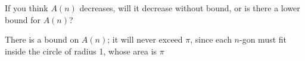 \documentclass{article}
\begin{document}
\begin{enumerate}
\begin{enumerate}
\begin{problem}[\vfill]
      If you think $A(n)$ decreases, will it decrease without bound, or is there a lower bound for $A(n)$?
    \end{problem}

    \begin{solution}       
      There is a bound on $A(n)$; it will never exceed $\pi$, since each $n$-gon must fit inside the circle of radius 1, whose area is $\pi$
    \end{solution}

  \end{enumerate}

\end{enumerate}
\end{document}
